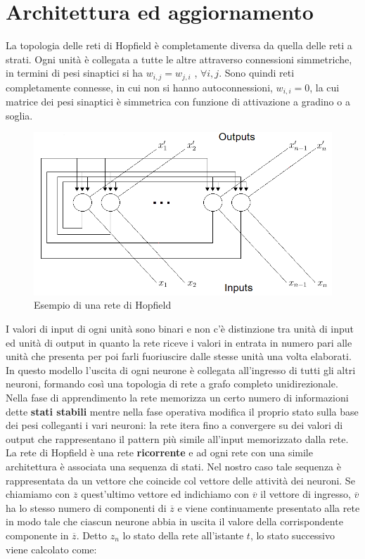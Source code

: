\documentclass[12pt,a4paper,oneside]{book}
\begin{document}
	\section{Architettura ed aggiornamento}

	La topologia delle reti di Hopfield è completamente diversa da quella delle reti a strati. Ogni unità è collegata a tutte le altre attraverso connessioni simmetriche, in termini di pesi sinaptici si ha $w_{i,j} = w_{j,i}$ , $\forall i,j$. Sono quindi reti completamente connesse, in cui non si hanno autoconnessioni, $w_{i,i}=0$, la cui matrice dei pesi sinaptici è simmetrica con funzione di attivazione a gradino o a soglia. \\
	
	\begin{figure}[h]
		\centering
		\includegraphics[width=0.9\linewidth]{IMMAGINI/hopfield}
		\caption{Esempio di una rete di Hopfield}
		\label{fig:hopfield}
	\end{figure}

	I valori di input di ogni unità sono binari e non c'è distinzione tra unità di input ed unità di output in quanto la rete riceve i valori in entrata in numero pari alle unità che presenta per poi farli fuoriuscire dalle stesse unità una volta elaborati. In questo modello l'uscita di ogni neurone è collegata all'ingresso di tutti gli altri neuroni, formando così una topologia di rete a grafo completo unidirezionale.\\
	Nella fase di apprendimento la rete memorizza un certo numero di informazioni dette \textbf{stati stabili} mentre nella fase operativa modifica il proprio stato sulla base dei pesi colleganti i vari neuroni: la rete itera fino a convergere su dei valori di output che rappresentano il pattern più simile all'input memorizzato dalla rete. La rete di Hopfield è una rete \textbf{ricorrente} e ad ogni rete con una simile architettura è associata una sequenza di stati. Nel nostro caso tale sequenza è rappresentata da un vettore che coincide col vettore delle attività dei neuroni. Se chiamiamo con $\overline z$ quest'ultimo vettore ed indichiamo con $\overline v$ il vettore di ingresso, $\overline v$ ha lo stesso numero di componenti di $\overline z$ e viene continuamente presentato alla rete in modo tale che ciascun neurone abbia in uscita il valore della corrispondente componente in $\overline z$. Detto $z_{n}$ lo stato della rete all'istante $t$, lo stato successivo viene calcolato come:
\end{document}
